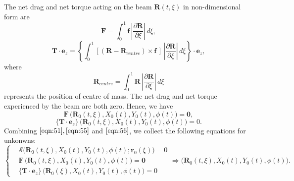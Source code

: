 \documentclass[a4paper,12pt]{article}
\begin{document}
The net drag and net torque acting on the beam $\textbf{R}(t,\xi)$ in non-dimensional form are 
\begin{equation}
	\label{eqn:52}
	\textbf{F}=\int^1_0 \textbf{f}\, \left|\frac{\partial\textbf{R}}{\partial\xi}\right|\,d\xi, 
\end{equation}
\begin{equation}
	\label{eqn:53}
	\mathbf{T}\cdot\textbf{e}_z=\left\{\int^1_0 \left[(\textbf{R}-\textbf{R}_{centre})\times \textbf{f}\,\right]\,\left|\frac{\partial\textbf{R}}{\partial\xi}\right|\,d\xi\right\}\cdot\textbf{e}_z,
\end{equation}
where 
\begin{equation}
	\label{eqn:54}
	\textbf{R}_{centre}=\int^1_0 \textbf{R}\,|\frac{\partial\textbf{R}}{\partial\xi}|\,d\xi
\end{equation}
represents the position of centre of mass. The net drag and net torque experienced by the beam are both zero. Hence, we have 
\begin{equation}
	\label{eqn:55}
	\textbf{F}\,\Big(\textbf{R}_0(t,\xi), X_0(t), Y_0(t), \phi(t)\Big)=\textbf{0},
\end{equation}
\begin{equation}
	\label{eqn:56}
	\{\mathbf{T}\cdot\textbf{e}_z\}\,\Big(\textbf{R}_0(t,\xi), X_0(t), Y_0(t), \phi(t)\Big)=0.
\end{equation} 
Combining $\eqref{eqn:51}, \eqref{eqn:55}$ and $\eqref{eqn:56}$, we collect the following equations for unkonwns:
\begin{equation}
	\label{eqn:57}
	\left\{\begin{aligned}
		&\bm{\mathcal{S}}\Big(\textbf{R}_0(t,\xi), X_0(t), Y_0(t),\phi(t);\textbf{r}_0(\xi)\Big)=0\\
		&\textbf{F}\,\Big(\textbf{R}_0(t,\xi), X_0(t), Y_0(t),\phi(t)\Big)=\textbf{0}\\
		&\{\mathbf{T}\cdot\textbf{e}_z\}\,\Big(\textbf{R}_0(\xi), X_0(t), Y_0(t),\phi(t)\Big)=0
	\end{aligned}\right.\Longrightarrow \Big(\textbf{R}_0(t,\xi), X_0(t), Y_0(t),\phi(t)\Big).
\end{equation}
\end{document}
